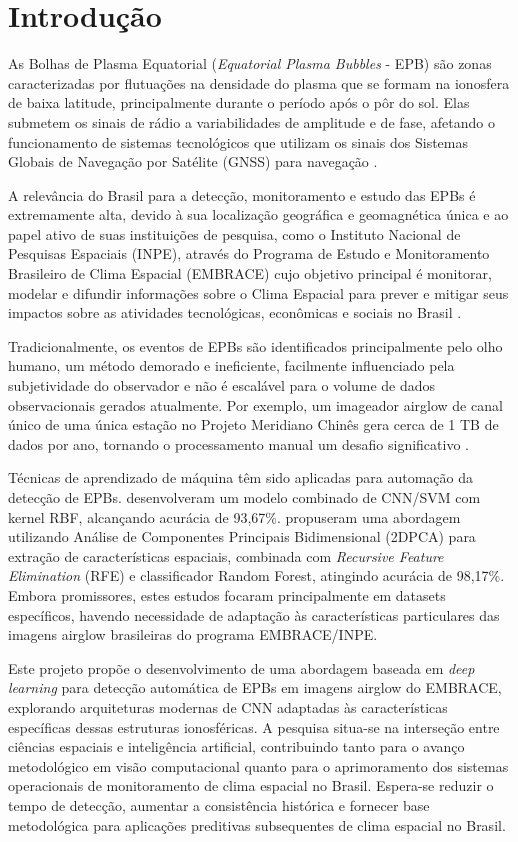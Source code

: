\chapter{Introdução}

As Bolhas de Plasma Equatorial (\textit{Equatorial Plasma Bubbles} - EPB) são zonas caracterizadas por flutuações na densidade do plasma que se formam na ionosfera de baixa latitude, principalmente durante o período após o pôr do sol. Elas submetem os sinais de rádio a variabilidades de amplitude e de fase, afetando o funcionamento de sistemas tecnológicos que utilizam os sinais dos Sistemas Globais de Navegação por Satélite (GNSS) para navegação \cite{Githio2024}.

A relevância do Brasil para a detecção, monitoramento e estudo das EPBs é extremamente alta, devido à sua localização geográfica e geomagnética única e ao papel ativo de suas instituições de pesquisa, como o Instituto Nacional de Pesquisas Espaciais (INPE), através do Programa de Estudo e Monitoramento Brasileiro de Clima Espacial (EMBRACE) cujo objetivo principal é monitorar, modelar e difundir informações sobre o Clima Espacial para prever e mitigar seus impactos sobre as atividades tecnológicas, econômicas e sociais no Brasil \cite{EMBRACE2021}.

Tradicionalmente, os eventos de EPBs são identificados principalmente pelo olho humano, um método demorado e ineficiente, facilmente influenciado pela subjetividade do observador e não é escalável para o volume de dados observacionais gerados atualmente. Por exemplo, um imageador airglow de canal único de uma única estação no Projeto Meridiano Chinês gera cerca de 1 TB de dados por ano, tornando o processamento manual um desafio significativo \cite{Zhong2025}.

Técnicas de aprendizado de máquina têm sido aplicadas para automação da detecção de EPBs.  desenvolveram um modelo combinado de CNN/SVM com kernel RBF, alcançando acurácia de 93,67\%.  propuseram uma abordagem utilizando Análise de Componentes Principais Bidimensional (2DPCA) para extração de características espaciais, combinada com \textit{Recursive Feature Elimination} (RFE) e classificador Random Forest, atingindo acurácia de 98,17\%. Embora promissores, estes estudos focaram principalmente em datasets específicos, havendo necessidade de adaptação às características particulares das imagens airglow brasileiras do programa EMBRACE/INPE.


Este projeto propõe o desenvolvimento de uma abordagem baseada em \textit{deep learning} para detecção automática de EPBs em imagens airglow do EMBRACE, explorando arquiteturas modernas de CNN adaptadas às características específicas dessas estruturas ionosféricas. A pesquisa situa-se na interseção entre ciências espaciais e inteligência artificial, contribuindo tanto para o avanço metodológico em visão computacional quanto para o aprimoramento dos sistemas operacionais de monitoramento de clima espacial no Brasil. Espera-se reduzir o tempo de detecção, aumentar a consistência histórica e fornecer base metodológica para aplicações preditivas subsequentes de clima espacial no Brasil.
